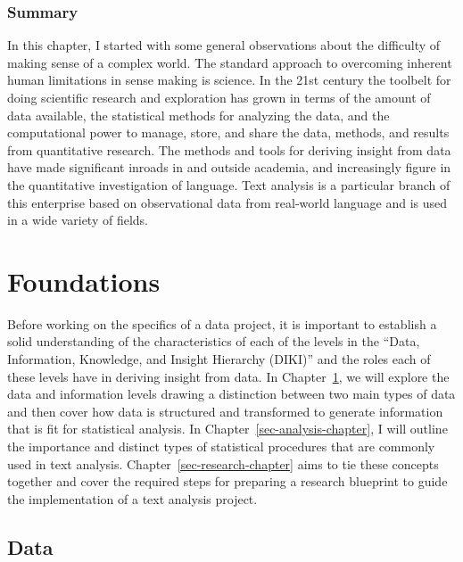 \documentclass[
  letterpaper,
  krantz1]{latex/krantz-mod}
\newcommand{\setDOI}[1]{\gdef\doi{#1}}
\theoremstyle{definition}
\theoremstyle{definition}
\theoremstyle{remark}
\begin{document}
\section*{Summary}\label{summary}


In this chapter, I started with some general observations about the
difficulty of making sense of a complex world. The standard approach to
overcoming inherent human limitations in sense making is science. In the
21st century the toolbelt for doing scientific research and exploration
has grown in terms of the amount of data available, the statistical
methods for analyzing the data, and the computational power to manage,
store, and share the data, methods, and results from quantitative
research. The methods and tools for deriving insight from data have made
significant inroads in and outside academia, and increasingly figure in
the quantitative investigation of language. Text analysis is a
particular branch of this enterprise based on observational data from
real-world language and is used in a wide variety of fields.

\part{Foundations}

Before working on the specifics of a data project, it is important to
establish a solid understanding of the characteristics of each of the
levels in the ``Data, Information, Knowledge, and Insight Hierarchy
(DIKI)'' and the roles each of these levels have in deriving insight
from data. In Chapter~\ref{sec-data-chapter}, we will explore the data
and information levels drawing a distinction between two main types of
data and then cover how data is structured and transformed to generate
information that is fit for statistical analysis. In
Chapter~\ref{sec-analysis-chapter}, I will outline the importance and
distinct types of statistical procedures that are commonly used in text
analysis. Chapter~\ref{sec-research-chapter} aims to tie these concepts
together and cover the required steps for preparing a research blueprint
to guide the implementation of a text analysis project.

\chapter{Data}\label{sec-data-chapter}

\setDOI{10.4324/9781003393764.2}
\thispagestyle{chapterfirstpage}
\end{document}
